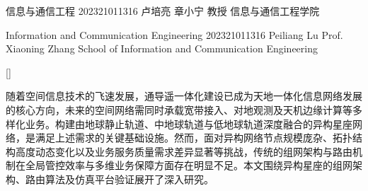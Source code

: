 \documentclass[print, master, vlined]{DissertUESTC}
\begin{document}
    \raggedbottom
    
				{信息与通信工程}
				{202321011316}
				{卢培亮}
				{章小宁}
				{教授}%
				{信息与通信工程学院}  %



	\ClsNum{}  %
	\ClsLv{}  %
	\UDC{}  %
	

	\uestczhtitlepage  %

					{Information and Communication Engineering}
					{202321011316}
					{Peiliang Lu}
					{Prof. Xiaoning Zhang}{}
					{School of Information and Communication Engineering}
	
	[]{}
 

	\zhabstract
    随着空间信息技术的飞速发展，通导遥一体化建设已成为天地一体化信息网络发展的核心方向，未来的空间网络需同时承载宽带接入、对地观测及天机边缘计算等多样化业务。构建由地球静止轨道、中地球轨道与低地球轨道深度融合的异构星座网络，是满足上述需求的关键基础设施。然而，面对异构网络节点规模庞杂、拓扑结构高度动态变化以及业务服务质量需求差异显著等挑战，传统的组网架构与路由机制在全局管控效率与多维业务保障方面存在明显不足。本文围绕异构星座的组网架构、路由算法及仿真平台验证展开了深入研究。
\end{document}
